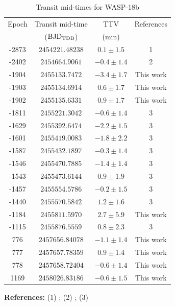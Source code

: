 \begin{table}[ht]
\centering
\begin{threeparttable}
\caption{Transit mid-times for WASP-18b}
\label{times_wasp18}
\begin{tabular}{cccc}
\hline \hline
Epoch & Transit mid-time & TTV & References\\
      & (${\rm BJD_{TDB}}$) & (min) & \\
\hline 
-2873 & $2454221.48238$ & $0.1\pm1.5$ & 1\\
-2402 & $2454664.9061$ & $-0.4\pm1.4$ & 2 \\
-1904 & $2455133.7472$ & $-3.4\pm1.7$ & This work \\
-1903 & $2455134.6914$ & $0.6\pm1.7$ & This work \\
-1902 & $2455135.6331$  & $0.9\pm1.7$  & This work \\
-1811 & $2455221.3042$ & $-0.6\pm1.4$  & 3\\
-1629 & $2455392.6474$ & $-2.2\pm1.5$& 3 \\
-1601 & $2455419.0083$ & $-1.8\pm2.2$& 3\\
-1587 & $2455432.1897$ & $-0.3\pm1.4$ & 3\\
-1546 & $2455470.7885$ & $-1.4\pm1.4$ & 3\\
-1543 & $2455473.6144$ & $0.9\pm1.9$& 3\\
-1457 & $2455554.5786$ & $-0.2\pm1.5$&3 \\
-1440 & $2455570.5842$ & $1.2\pm1.6$& 3\\
-1184 & $2455811.5970$ &  $2.7\pm5.9$ & This work  \\
-1115 & $2455876.5559$ & $0.8\pm2.3$ & 3 \\ 
776 & $2457656.84078$ & $-1.1\pm1.4$ & This work  \\
777 & $2457657.78359$   & $0.9\pm1.4$ & This work\\
778 & $2457658.72404$ & $-0.6\pm1.4$ & This work \\
1169 & $2458026.83186$ & $-0.6\pm1.5$ & This work  \\
\hline
\end{tabular}
\begin{tablenotes}
\item \textbf{References:} 
(1) \cite{Hellier2009}; 
 (2) \cite{Triaud2010}; 
 (3) \cite{Maxted2013}
\end{tablenotes}
\end{threeparttable}
\end{table} 

